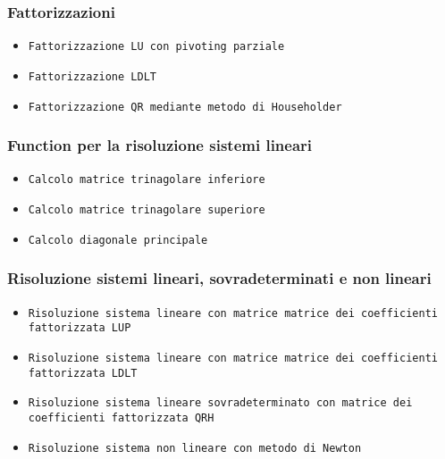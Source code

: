 \label{functcap3}
\begin{flushleft}
\subsubsection{Fattorizzazioni}
\begin{itemize}
    \item \texttt{Fattorizzazione LU con pivoting parziale}

    \item \texttt{Fattorizzazione LDLT}

    \item \texttt{Fattorizzazione QR mediante metodo di Householder}

\end{itemize}
\subsubsection{Function per la risoluzione sistemi lineari}
\begin{itemize}
    \item \texttt{Calcolo matrice trinagolare inferiore}

    \item \texttt{Calcolo matrice trinagolare superiore}

    \item \texttt{Calcolo diagonale principale}

\end{itemize}
\subsubsection{Risoluzione sistemi lineari, sovradeterminati e non lineari}
\begin{itemize}
    \item \texttt{Risoluzione sistema lineare con matrice matrice dei coefficienti fattorizzata LUP}

    \item \texttt{Risoluzione sistema lineare con matrice matrice dei coefficienti fattorizzata LDLT}

    \item \texttt{Risoluzione sistema lineare sovradeterminato con matrice dei coefficienti fattorizzata QRH}

    \item \texttt{Risoluzione sistema non lineare con metodo di Newton}

\end{itemize}
\end{flushleft}